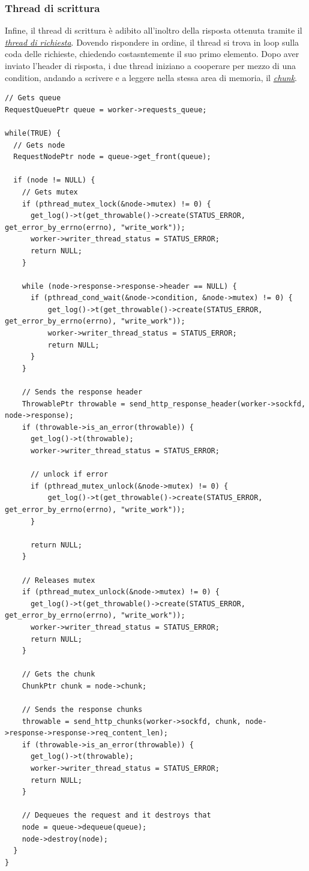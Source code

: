 \documentclass[italian]{tktltiki2}
\begin{document}
\subsubsection{Thread di scrittura}
\label{sec:writer}
Infine, il thread di scrittura è adibito all'inoltro della risposta ottenuta tramite il \hyperref[sec:request]{\emph{thread di richiesta}}. Dovendo rispondere in ordine, il thread si trova in loop sulla coda delle richieste, chiedendo costasntemente il suo primo elemento. Dopo aver inviato l'header di risposta, i due thread iniziano a cooperare per mezzo di una condition, andando a scrivere e a leggere nella stessa area di memoria, il \hyperref[sec:chunk]{\emph{chunk}}.
\begin{lstlisting}
// Gets queue
RequestQueuePtr queue = worker->requests_queue;

while(TRUE) {
  // Gets node
  RequestNodePtr node = queue->get_front(queue);

  if (node != NULL) {
    // Gets mutex
    if (pthread_mutex_lock(&node->mutex) != 0) {
      get_log()->t(get_throwable()->create(STATUS_ERROR, get_error_by_errno(errno), "write_work"));
      worker->writer_thread_status = STATUS_ERROR;
      return NULL;
    }

    while (node->response->response->header == NULL) {
      if (pthread_cond_wait(&node->condition, &node->mutex) != 0) {
          get_log()->t(get_throwable()->create(STATUS_ERROR, get_error_by_errno(errno), "write_work"));
          worker->writer_thread_status = STATUS_ERROR;
          return NULL;
      }
    }

    // Sends the response header
    ThrowablePtr throwable = send_http_response_header(worker->sockfd, node->response);
    if (throwable->is_an_error(throwable)) {
      get_log()->t(throwable);
      worker->writer_thread_status = STATUS_ERROR;

      // unlock if error
      if (pthread_mutex_unlock(&node->mutex) != 0) {
          get_log()->t(get_throwable()->create(STATUS_ERROR, get_error_by_errno(errno), "write_work"));
      }

      return NULL;
    }

    // Releases mutex
    if (pthread_mutex_unlock(&node->mutex) != 0) {
      get_log()->t(get_throwable()->create(STATUS_ERROR, get_error_by_errno(errno), "write_work"));
      worker->writer_thread_status = STATUS_ERROR;
      return NULL;
    }

    // Gets the chunk
    ChunkPtr chunk = node->chunk;

    // Sends the response chunks
    throwable = send_http_chunks(worker->sockfd, chunk, node->response->response->req_content_len);
    if (throwable->is_an_error(throwable)) {
      get_log()->t(throwable);
      worker->writer_thread_status = STATUS_ERROR;
      return NULL;
    }

    // Dequeues the request and it destroys that
    node = queue->dequeue(queue);
    node->destroy(node);
  }
}
\end{lstlisting}
\end{document}
